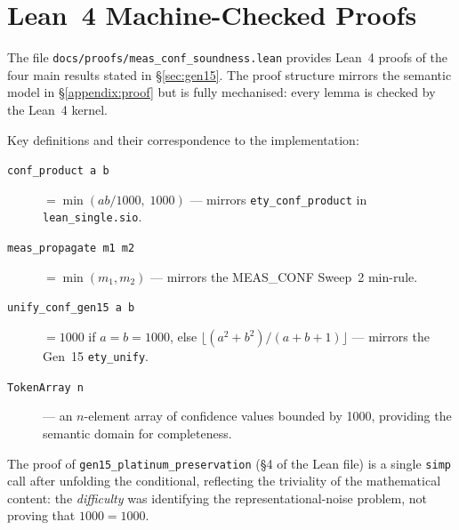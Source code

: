 \documentclass[acmsmall,screen,review,anonymous]{acmart}
\begin{document}



\appendix


\section{Lean~4 Machine-Checked Proofs}
\label{appendix:lean}

The file \texttt{docs/proofs/meas\_conf\_soundness.lean} provides
Lean~4 proofs of the four main results stated in \S\ref{sec:gen15}.
The proof structure mirrors the semantic model in \S\ref{appendix:proof}
but is fully mechanised: every lemma is checked by the Lean~4 kernel.

Key definitions and their correspondence to the implementation:
\begin{description}
  \item[\texttt{conf\_product a b}] $= \min(ab/1000,\;1000)$ — mirrors
        \texttt{ety\_conf\_product} in \texttt{lean\_single.sio}.
  \item[\texttt{meas\_propagate m1 m2}] $= \min(m_1, m_2)$ — mirrors
        the MEAS\_CONF Sweep~2 min-rule.
  \item[\texttt{unify\_conf\_gen15 a b}] $= 1000$ if $a=b=1000$, else
        $\lfloor(a^2+b^2)/(a+b+1)\rfloor$ — mirrors the Gen~15 \texttt{ety\_unify}.
  \item[\texttt{TokenArray n}] — an $n$-element array of confidence values
        bounded by 1000, providing the semantic domain for completeness.
\end{description}

The proof of \texttt{gen15\_platinum\_preservation} (\S4 of the Lean file)
is a single \texttt{simp} call after unfolding the conditional, reflecting
the triviality of the mathematical content: the \emph{difficulty} was
identifying the representational-noise problem, not proving that
$1000 = 1000$.
\end{document}
